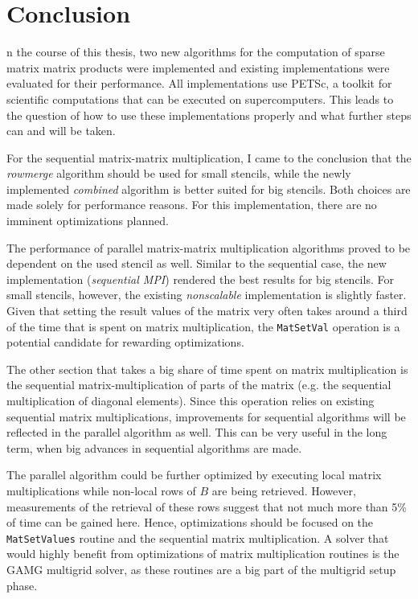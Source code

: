 \chapter*{\vspace*{-20mm}Conclusion}


n the course of this thesis, two new algorithms for the computation of sparse matrix matrix products were implemented and existing implementations were evaluated for their performance. All implementations use PETSc, a toolkit for scientific computations that can be executed on supercomputers. This leads to the question of how to use these implementations properly and what further steps can and will be taken. 

For the sequential matrix-matrix multiplication, I came to the conclusion that the \textit{rowmerge} algorithm should be used for small stencils, while the newly implemented \textit{combined} algorithm is better suited for big stencils. Both choices are made solely for performance reasons. For this implementation, there are no imminent optimizations planned. 

The performance of parallel matrix-matrix multiplication algorithms proved to be dependent on the used stencil as well. Similar to the sequential case, the new implementation (\textit{sequential MPI}) rendered the best results for big stencils. %
For small stencils, however, the existing \textit{nonscalable} implementation is slightly faster. Given that setting the result values of the matrix very often takes around a third of the time that is spent on matrix multiplication, the \texttt{MatSetVal} operation is a potential candidate for rewarding optimizations. 

The other section that takes a big share of time spent on matrix multiplication is the sequential matrix-multiplication of parts of the matrix (e.g. the sequential multiplication of diagonal elements). Since this operation relies on existing sequential matrix multiplications, improvements for sequential algorithms will be reflected in the parallel algorithm as well. This can be very useful in the long term, when big advances in sequential algorithms are made.

The parallel algorithm could be further optimized by executing local matrix multiplications while non-local rows of $B$ are being retrieved. However, measurements of the retrieval of these rows suggest that not much more than 5\% of time can be gained here. Hence, optimizations should be focused on the \texttt{MatSetValues} routine and the sequential matrix multiplication. A solver that would highly benefit from optimizations of matrix multiplication routines is the GAMG multigrid solver, as these routines are a big part of the multigrid setup phase.

